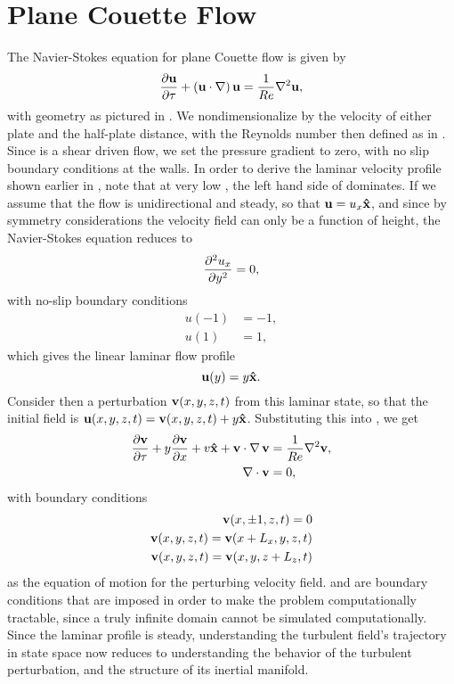 \section{Plane Couette Flow}
The Navier-Stokes equation for plane Couette flow is given by 
\begin{equation}\label{eq:NSPCF}
\pder{1}{\Vector{u}}{\tau} + \paren{\Vector{u}\cdot\nabla}\Vector{u} = \frac{1}{\ReN}\nabla^2\Vector{u},
\end{equation}
with geometry as pictured in . We nondimensionalize by the velocity of either plate and the half-plate distance, with the Reynolds number then defined as in . Since \pCf is a shear driven flow, we set the pressure gradient to zero, with no slip boundary conditions at the walls. In order to derive the laminar velocity profile shown earlier in , note that at very low \ReN, the left hand side of  dominates. If we assume that the flow is unidirectional and steady, so that $\mathbf{u} = u_x \mathbf{\hat{x}}$, and since by symmetry considerations the velocity field can only be a function of height, the Navier-Stokes equation reduces to 
\begin{equation}
\pder{2}{u_x}{y} = 0,
\end{equation}
with no-slip boundary conditions 
\begin{align}
u(-1) &= -1,\\
u(1) &= 1,
\end{align}
which gives the linear laminar flow profile 
\begin{equation}
\mathbf{u}(y) = y\mathbf{\hat{x}}.
\end{equation}
Consider then a perturbation $\mathbf{v}(x,y,z,t)$ from this laminar state, so that the initial field is $\mathbf{u}(x,y,z,t) = \mathbf{v} (x,y,z,t)+ y\mathbf{\hat{x}}$. Substituting this into , we get 
\begin{align}
\pder{1}{\Vector{v}}{\tau} + y\pder{1}{\Vector{v}}{x} + v\Vector{\hat{x}} + \Vector{v}\cdot\Grad{\Vector{v}} &= \frac{1}{\ReN} \nabla^2\Vector{v},\label{eq:PertND}\\
\Div{\Vector{v}} &= 0,
\end{align}
with boundary conditions 
\begin{align}
\mathbf{v}(x,\pm 1,z,t) = 0\\
\mathbf{v}(x,y,z,t) = \mathbf{v}(x+L_x,y,z,t)\label{eq:periodicBCx}\\
\mathbf{v}(x,y,z,t) = \mathbf{v}(x,y,z+L_z,t)\label{eq:periodicBCz}
\end{align}
 as the equation of motion for the perturbing velocity field.   and  are boundary conditions that are imposed in order to make the problem computationally tractable, since a truly infinite domain cannot be simulated computationally. Since the laminar profile is steady, understanding the turbulent field's trajectory in state space now reduces to understanding the behavior of the turbulent perturbation, and the structure of its inertial manifold. 
